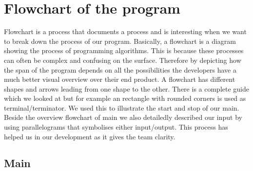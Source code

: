 \section{Flowchart of the program}
Flowchart is a process that documents a process and is interesting when we want
to break down the process of our program.
Basically, a flowchart is a diagram showing the process of programming algorithms.
This is because these processes can often be complex and confusing on the surface.
Therefore by depicting how the span of the program depends on all the possibilities the developers have a much better
visual overview over their end product.
A flowchart has different shapes and arrows leading from one shape to the other.
There is a complete guide which we looked at but for example an rectangle with rounded corners
is used as terminal/terminator.
We used this to illustrate the start and stop of our main.
Beside the overview flowchart of main we also detailedly described our input by
using parallelograms that symbolises either input/output.
This process has helped us in our development as it gives the team clarity.


\subsection{Main}
\noindent
{}

